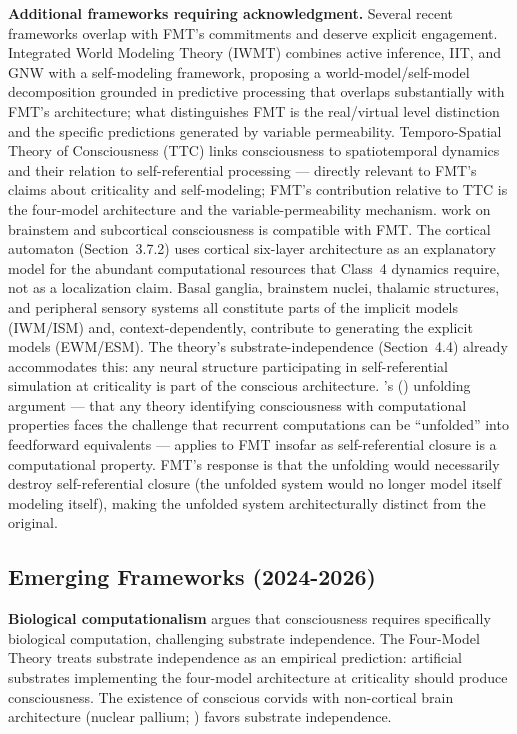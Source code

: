 \documentclass[12pt]{article}
\newcommand{\revstart}{}
\newcommand{\revend}{}
\begin{document}
{\revstart\textbf{Additional frameworks requiring acknowledgment.} Several recent frameworks overlap with FMT's commitments and deserve explicit engagement. \citet{Safron2020} Integrated World Modeling Theory (IWMT) combines active inference, IIT, and GNW with a self-modeling framework, proposing a world-model/self-model decomposition grounded in predictive processing that overlaps substantially with FMT's architecture; what distinguishes FMT is the real/virtual level distinction and the specific predictions generated by variable permeability. \citet{Northoff2020} Temporo-Spatial Theory of Consciousness (TTC) links consciousness to spatiotemporal dynamics and their relation to self-referential processing --- directly relevant to FMT's claims about criticality and self-modeling; FMT's contribution relative to TTC is the four-model architecture and the variable-permeability mechanism. \citet{Solms2021} work on brainstem and subcortical consciousness is compatible with FMT. The cortical automaton (Section~3.7.2) uses cortical six-layer architecture as an explanatory model for the abundant computational resources that Class~4 dynamics require, not as a localization claim. Basal ganglia, brainstem nuclei, thalamic structures, and peripheral sensory systems all constitute parts of the implicit models (IWM/ISM) and, context-dependently, contribute to generating the explicit models (EWM/ESM). The theory's substrate-independence (Section~4.4) already accommodates this: any neural structure participating in self-referential simulation at criticality is part of the conscious architecture. \citeauthor{Doerig2019}'s (\citeyear{Doerig2019}) unfolding argument --- that any theory identifying consciousness with computational properties faces the challenge that recurrent computations can be ``unfolded'' into feedforward equivalents --- applies to FMT insofar as self-referential closure is a computational property. FMT's response is that the unfolding would necessarily destroy self-referential closure (the unfolded system would no longer model itself modeling itself), making the unfolded system architecturally distinct from the original.\revend}


\subsection{Emerging Frameworks (2024-2026)}


\textbf{Biological computationalism} \citep{Milinkovic2025} argues that consciousness requires specifically biological computation, challenging substrate independence. The Four-Model Theory treats substrate independence as an empirical prediction: artificial substrates implementing the four-model architecture at criticality should produce consciousness. The existence of conscious corvids with non-cortical brain architecture (nuclear pallium; \citealp{Gunturkun2016}) favors substrate independence.
\end{document}
